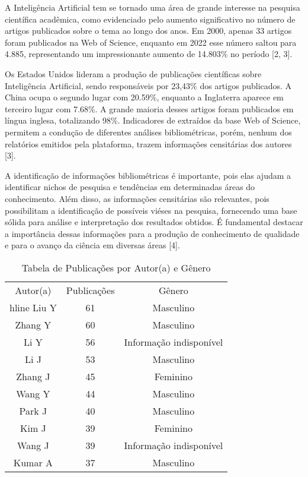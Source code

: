 \documentclass[conference,compsoc]{IEEEtran}
\begin{document}
A Inteligência Artificial tem se tornado uma área de grande interesse na pesquisa científica acadêmica, como evidenciado pelo aumento significativo no número de artigos publicados sobre o tema ao longo dos anos. Em 2000, apenas 33 artigos foram publicados na Web of Science, enquanto em 2022 esse número saltou para 4.885, representando um impressionante aumento de 14.803\% no período [2, 3].

Os Estados Unidos lideram a produção de publicações científicas sobre Inteligência Artificial, sendo responsáveis por 23,43\% dos artigos publicados. A China ocupa o segundo lugar com 20.59\%, enquanto a Inglaterra aparece em terceiro lugar com 7.68\%. A grande maioria desses artigos foram publicados em língua inglesa, totalizando 98\%. Indicadores de extraídos da base Web of Science, permitem a condução de diferentes análises bibliométricas, porém, nenhum dos relatórios emitidos pela plataforma, trazem informações censitárias dos autores [3].

A identificação de informações bibliométricas é importante, pois elas ajudam a identificar nichos de pesquisa e tendências em determinadas áreas do conhecimento. Além disso, as informações censitárias são relevantes, pois possibilitam a identificação de possíveis viéses na pesquisa, fornecendo uma base sólida para análise e interpretação dos resultados obtidos. É fundamental destacar a importância dessas informações para a produção de conhecimento de qualidade e para o avanço da ciência em diversas áreas [4].

\begin{table}[h!]
\centering
\caption{Tabela de Publicações por Autor(a) e Gênero}
\label{tab:publicacoes_genero}
\begin{tabular}{c|c|c}
\hline
Autor(a) & Publicações & Gênero \\hline
Liu Y & 61 & Masculino\\
Zhang Y & 60 & Masculino\\
Li Y & 56 & Informação indisponível\\
Li J & 53 & Masculino\\
Zhang J & 45 & Feminino\\
Wang Y & 44 & Masculino\\
Park J & 40 & Masculino\\
Kim J & 39 & Feminino\\
Wang J & 39 & Informação indisponível\\
Kumar A & 37 & Masculino\\
\hline
\end{tabular}
\end{table}
\end{document}
